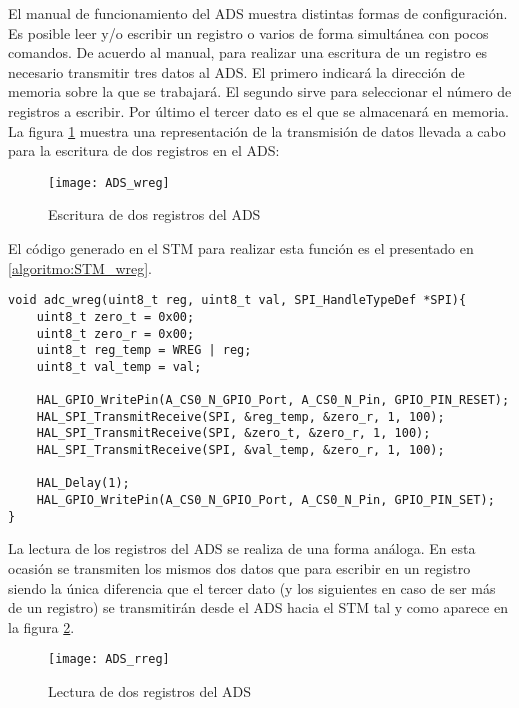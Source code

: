 El manual de funcionamiento del ADS muestra distintas formas de configuración. Es posible leer y/o escribir un registro o varios de forma simultánea con pocos comandos. De acuerdo al manual, para realizar una escritura de un registro es necesario transmitir tres datos al ADS. El primero indicará la dirección de memoria sobre la que se trabajará. El segundo sirve para seleccionar el número de registros a escribir. Por último el tercer dato es el que se almacenará en memoria. La figura \ref{fig:ADS_wreg} muestra una representación de la transmisión de datos llevada a cabo para la escritura de dos registros en el ADS:

\begin{figure} [h]
    \centering
    \texttt{[image: ADS\_wreg]}
    \caption{Escritura de dos registros del ADS \cite{Datasheet_ADS}}
    \label{fig:ADS_wreg}
\end{figure}

El código generado en el STM para realizar esta función es el presentado en \ref{algoritmo:STM_wreg}.

\begin{lstlisting}[label=algoritmo:STM_wreg,style = STM-code,frame=single,caption=Escritura en registros del ADS]
void adc_wreg(uint8_t reg, uint8_t val, SPI_HandleTypeDef *SPI){
	uint8_t zero_t = 0x00;
	uint8_t zero_r = 0x00;
	uint8_t reg_temp = WREG | reg;
	uint8_t val_temp = val;
	
	HAL_GPIO_WritePin(A_CS0_N_GPIO_Port, A_CS0_N_Pin, GPIO_PIN_RESET);
	HAL_SPI_TransmitReceive(SPI, &reg_temp, &zero_r, 1, 100);
	HAL_SPI_TransmitReceive(SPI, &zero_t, &zero_r, 1, 100);	
	HAL_SPI_TransmitReceive(SPI, &val_temp, &zero_r, 1, 100);	

	HAL_Delay(1);
	HAL_GPIO_WritePin(A_CS0_N_GPIO_Port, A_CS0_N_Pin, GPIO_PIN_SET);
}
\end{lstlisting}

La lectura de los registros del ADS se realiza de una forma análoga. En esta ocasión se transmiten los mismos dos datos que para escribir en un registro siendo la única diferencia que el tercer dato (y los siguientes en caso de ser más de un registro) se transmitirán desde el ADS hacia el STM tal y como aparece en la figura \ref{fig:ADS_rreg}.

\begin{figure} [h]
    \centering
    \texttt{[image: ADS\_rreg]}
    \caption{Lectura de dos registros del ADS \cite{Datasheet_ADS}}
    \label{fig:ADS_rreg}
\end{figure}

